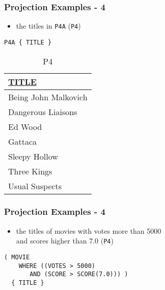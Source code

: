 \documentclass[dvipsnames]{beamer}
\theoremstyle{plain}
\begin{document}
\begin{frame}[fragile]
  \frametitle{Projection Examples - 4}

  \begin{example}
    \begin{itemize}
      \item the titles in \texttt{P4A} (\texttt{P4})
    \end{itemize}

    \begin{lstlisting}
P4A { TITLE }
    \end{lstlisting}

    \pause
    \vspace{-10pt}
    \begin{tiny}
    \begin{table}
      \caption{P4}
      \begin{tabular}{|l|}\hline
\underline{TITLE}   \\[2pt]\hline\hline
Being John Malkovich\\\hline
Dangerous Liaisons  \\\hline
Ed Wood             \\\hline
Gattaca             \\\hline
Sleepy Hollow       \\\hline
Three Kings         \\\hline
Usual Suspects      \\\hline
      \end{tabular}
    \end{table}
    \end{tiny}
  \end{example}
\end{frame}

\begin{frame}[fragile]
  \frametitle{Projection Examples - 4}

  \begin{example}
    \begin{itemize}
      \item the titles of movies with votes more than 5000\\
        and scores higher than 7.0 (\texttt{P4})
    \end{itemize}

    \begin{lstlisting}
( MOVIE
    WHERE ((VOTES > 5000)
       AND (SCORE > SCORE(7.0))) )
  { TITLE }
    \end{lstlisting}
  \end{example}
\end{frame}
\end{document}
